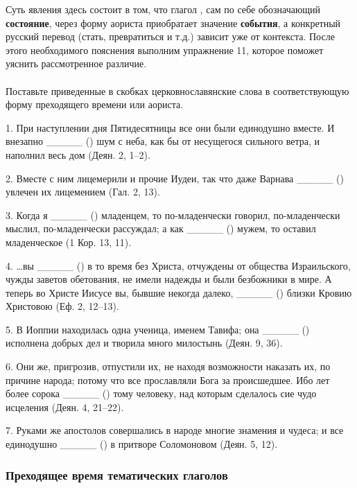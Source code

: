 \documentclass[11pt,a4paper,oneside]{memoir}
\newcommand{\exercise}{}
\begin{document}
  \medskip
  Суть явления здесь состоит в том, что глагол {}, сам по
  себе обозначающий \textbf{состояние}, через форму аориста
  приобратает значение \textbf{события}, а конкретный русский перевод
  (стать, превратиться и т.д.) зависит уже от контекста. После этого
  необходимого пояснения выполним упражнение 11, которое поможет
  уяснить рассмотренное различие.

  \paragraph{\exercise}

  Поставьте приведенные в скобках церковнославянские слова в
  соответствующую форму преходящего времени или аориста.

  1. При наступлении дня Пятидесятницы все они были единодушно
  вместе. И внезапно _____ ({}) шум с неба, как бы от
  несущегося сильного ветра, и наполнил весь дом (Деян. 2, 1--2).

  2. Вместе с ним лицемерили и прочие Иудеи, так что даже Варнава
  _____ ({}) увлечен их лицемением (Гал. 2, 13).

  3. Когда я _____ ({}) младенцем, то по-младенчески
  говорил, по-младенчески мыслил, по-младенчески рассуждал; а как
  _____ ({}) мужем, то оставил младенческое (1 Кор. 13, 11).

  4. \ldots вы _____ ({}) в то время без Христа, отчуждены
  от общества Израильского, чужды заветов обетования, не имели
  надежды и были безбожники в мире. А теперь во Христе Иисусе вы,
  бывшие некогда далеко, _____ ({}) близки Кровию
  Христовою (Еф. 2, 12--13).

  5. В Иоппии находилась одна ученица, именем Тавифа; она _____
  ({}) исполнена добрых дел и творила много милостынь (Деян. 9, 36).

  6. Они же, пригрозив, отпустили их, не находя возможности наказать
  их, по причине народа; потому что все прославляли Бога за
  происшедшее. Ибо лет более сорока _____ ({}) тому
  человеку, над которым сделалось сие чудо исцеления (Деян. 4, 21--22).

  7. Руками же апостолов совершались в народе многие знамения и
  чудеса; и все единодушно _____ ({}) в притворе
  Соломоновом (Деян. 5, 12).

  \subsubsection{Преходящее время тематических глаголов}
\end{document}
